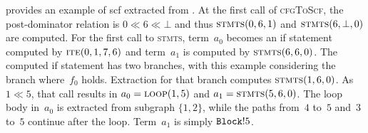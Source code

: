 \begin{example}
   provides an example of \ac{scf} extracted from .
  At the first call of \textsc{cfgToScf},
  the post-dominator relation is $0\ll 6\ll\bot$
  and thus $\textsc{stmts}(0,6,1)$ and $\textsc{stmts}(6,\bot,0)$ are computed.
  For the first call to \textsc{stmts},
  term~$a_0$ becomes an if statement computed by $\textsc{ite}(0,1,7,6)$
  and term~$a_1$ is computed by $\textsc{stmts}(6,6,0)$.
  The computed if statement has two branches,
  with this example considering the branch where~$f_0$ holds.
  Extraction for that branch computes $\textsc{stmts}(1,6,0)$.
  As $1\ll 5$, that call results in $a_0=\textsc{loop}(1,5)$
  and $a_1=\textsc{stmts}(5,6,0)$.
  The loop body in~$a_0$ is extracted from subgraph $\{1,2\}$,
  while the paths from~$4$ to~$5$ and~$3$ to~$5$ continue after the loop.
  Term~$a_1$ is simply $\texttt{Block}!5$.
\end{example}

